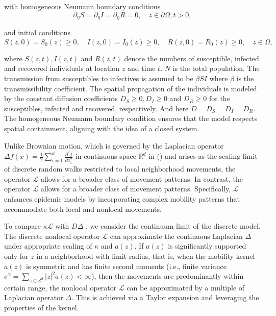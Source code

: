 \documentclass[sn-basic]{sn-jnl}%
\theoremstyle{thmstyleone}%
\theoremstyle{thmstyletwo}%
\theoremstyle{thmstylethree}%
\numberwithin{equation}{theorem}
\begin{document}
with homogeneous Neumann boundary conditions
$$
\partial_\eta S=\partial_\eta I=\partial_\eta R=0, \quad z \in \partial \Omega, t>0,
$$

and initial conditions
$$
S(z, 0)=S_0(z) \geqslant 0, \quad I(z, 0)=I_0(z) \geqslant 0, \quad R(z, 0)=R_0(z) \geqslant 0, \quad z \in \bar{\Omega},
$$

where $S(z, t), I(z, t)$ and $R(z, t)$ denote the numbers of susceptible, infected and recovered individuals at location $z$ and time $t$. $N$ is the total population. The transmission from susceptibles to infectives is assumed to be $\beta S I$ where $\beta$ is the transmissibility coefficient. The spatial propagation of the individuals is modeled by the constant diffusion coefficients $D_S \geqslant 0, D_I \geqslant 0$ and $D_R \geqslant 0$ for the susceptibles, infected and recovered, respectively. And here $D=D_S=D_I=D_R$. The homogeneous Neumann boundary condition ensures that the model respects spatial containment, aligning with the idea of a closed system.


 Unlike Brownian motion, which is governed by the Laplacian operator $\Delta f(x)=\frac{1}{2} \sum_{i=1}^d \frac{\partial^2 f}{\partial x_i^2}$ in continuous space $\mathbb{R}^d$ in (\citep{chinviriyasit2010numerical,ammi2023optimal,caraballo2018analysis}) and arises as the scaling limit of discrete random walks restricted to local neighborhood movements, the operator $\mathcal{L}$ allows for a broader class of movement patterns.  In contrast, the operator $\mathcal{L}$ allows for a broader class of movement patterns. Specifically, $\mathcal{L}$ enhances epidemic models by incorporating complex mobility patterns that accommodate both local and nonlocal movements. 


To compare $\kappa\mathcal{L}$ with $D\Delta$ , we consider the continuum limit of the discrete model. The discrete nonlocal operator $\mathcal{L}$ can approximate the continuous Laplacian $\Delta$ under appropriate scaling of $\kappa$ and $a(z)$. If $a(z)$ is significantly supported only for $z$ in a neighborhood with limit radius, that is, when the mobility kernel $a(z)$ is symmetric and has finite second moments (i.e., finite variance $\sigma^2=\sum\limits_{z\in Z^d}|z|^2a(z)<\infty$), then the movements are predominantly within certain range, the nonlocal operator $\mathcal{L}$ can be approximated by a multiple of Laplacian operator $\Delta$. This is achieved via a Taylor expansion and leveraging the properties of the kernel. 
\end{document}
